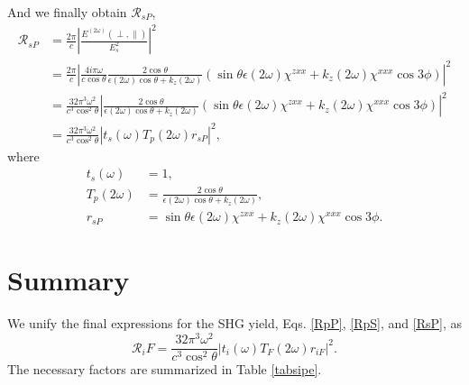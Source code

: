 And we finally obtain $\mathcal{R}_{sP}$,
\begin{align}
\mathcal{R}_{sP}
&= \frac{2\pi}{c}
   \left\vert\frac{E^{(2\omega)}(\perp,\parallel)}{E^{2}_{s}}\right\vert^{2}
   \nonumber\\
&= \frac{2\pi}{c}
   \left\vert
   \frac{4i\pi\omega}{c\cos\theta}
   \frac{2\cos\theta}{\epsilon(2\omega)\cos\theta + k_{z}(2\omega)}
   (\sin\theta\epsilon(2\omega)\chi^{zxx} + k_{z}(2\omega)\chi^{xxx}\cos3\phi)
   \right\vert^{2}\nonumber\\
&= \frac{32\pi^{3}\omega^{2}}{c^{3}\cos^{2}\theta}
   \left\vert
   \frac{2\cos\theta}{\epsilon(2\omega)\cos\theta + k_{z}(2\omega)}
   (\sin\theta\epsilon(2\omega)\chi^{zxx} + k_{z}(2\omega)\chi^{xxx}\cos3\phi)
   \right\vert^{2}\nonumber\\
&= \frac{32\pi^{3}\omega^{2}}{c^{3}\cos^{2}\theta}
   \left\vert t_{s}(\omega)T_{p}(2\omega)r_{sP}\right\vert^{2},
   \label{RsP}
\end{align}
where
\begin{equation*}
\begin{split}
t_{s}(\omega)
&= 1,\\
T_{p}(2\omega)
&= \frac{2\cos\theta}{\epsilon(2\omega)\cos\theta + k_{z}(2\omega)},\\
r_{sP} &=
\sin\theta\epsilon(2\omega)\chi^{zxx} + k_{z}(2\omega)\chi^{xxx}\cos3\phi.
\end{split}
\end{equation*}


\section{Summary}

We unify the final expressions for the SHG yield, Eqs. \eqref{RpP},
\eqref{RpS}, and \eqref{RsP}, as
\begin{equation}\label{Rsipe}
\mathcal{R}_iF = \frac{32\pi^{3}\omega^{2}}{c^{3}\cos^{2}\theta}
\left\vert t_{i}(\omega)T_{F}(2\omega)r_{iF}\right\vert^{2}.
\end{equation}
The necessary factors are summarized in Table \ref{tabsipe}.


